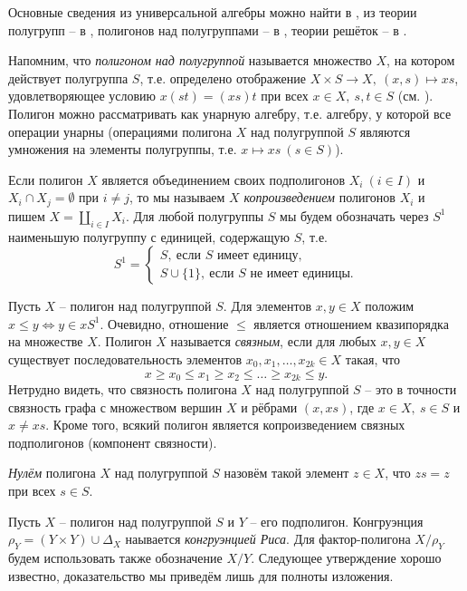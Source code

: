 \documentclass[a4paper]{article}
\begin{document}
	Основные сведения из универсальной алгебры можно найти в \cite{mal,kon}, из теории полугрупп -- в \cite{kliff}, полигонов над полугруппами -- в \cite{klip}, теории решёток -- в \cite{gretz}.
	\par Напомним, что \textit{полигоном над полугруппой} называется множество $X$, на котором действует полугруппа $S$, т.е. определено отображение $ X \times S \rightarrow X,\ (x,s) \mapsto xs $, удовлетворяющее условию $ x(st)=(xs)t $ при всех $x\in X,\ s,t\in S$ (см. \cite{klip}). Полигон можно рассматривать как унарную алгебру, т.е. алгебру, у которой все операции унарны (операциями полигона $X$ над полугруппой $S$ являются умножения на элементы полугруппы, т.е. $ x \mapsto xs \ (s\in S) $).
	\par Если полигон $X$ является объединением своих подполигонов $ X_i\ (i \in I) $ и $ X_i \cap X_j = \emptyset $ при $i \neq j$, то мы называем $X$ \textit{копроизведением} полигонов $X_i$ и пишем $ X = \coprod_{i\in I} X_i $. Для любой полугруппы $S$ мы будем обозначать через $S^1$ наименьшую полугруппу с единицей, содержащую $S$, т.е.
	$$ S^1 = 
		\begin{cases}
			S,\ \text{если $S$ имеет единицу,}\\
			S \cup \{1\},\ \text{если $S$ не имеет единицы.}
		\end{cases}
	$$
	\par Пусть $X$ -- полигон над полугруппой $S$. Для элементов $x,y \in X$ положим $ x \leqslant y \Leftrightarrow y \in xS^1 $. Очевидно, отношение $\leqslant$ является отношением квазипорядка на множестве $X$. Полигон $X$ называется \textit{связным}, если для любых $x,y\in X$ существует последовательность элементов $x_0,x_1,\ldots,x_{2k}\in X$ такая, что $$ x \geqslant x_0 \leqslant x_1 \geqslant x_2 \leqslant \ldots \geqslant x_{2k} \leqslant y. $$ Нетрудно видеть, что связность полигона $X$ над полугруппой $S$ -- это в точности связность графа с множеством вершин $X$ и рёбрами $ (x,xs) $, где $ x \in X,\ s \in S $ и $x \neq xs$. Кроме того, всякий полигон является копроизведением связных подполигонов (компонент связности).
	\par \textit{Нулём} полигона $X$ над полугруппой $S$ назовём такой элемент $z \in X$, что $zs=z$ при всех $s \in S$.
	\par Пусть $X$ -- полигон над полугруппой $S$ и $Y$ -- его подполигон. Конгруэнция $\rho_Y = (Y \times Y) \cup \Delta_X$ наывается \textit{конгруэнцией Риса}. Для фактор-полигона ${X}/{\rho_Y}$ будем использовать также обозначение $X/Y$. Следующее утверждение хорошо известно, доказательство мы приведём лишь для полноты изложения.
	
\end{document}
